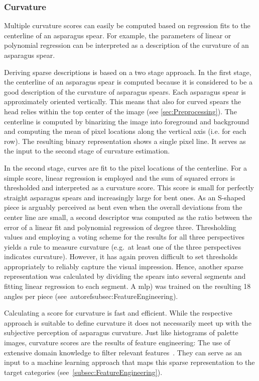 \subsubsection{Curvature}
\label{subsec:Curvature}

Multiple curvature scores can easily be computed based on regression fits to the centerline of an asparagus spear. For example, the parameters of linear or polynomial regression can be interpreted as a description of the curvature of an asparagus spear. 

Deriving sparse descriptions is based on a two stage approach. In the first stage, the centerline of an asparagus spear is computed because it is considered to be a good description of the curvature of asparagus spears. Each asparagus spear is approximately oriented vertically. This means that also for curved spears the head relies within the top center of the image (see \autoref{sec:Preprocessing}). The centerline is computed by binarizing the image into foreground and background and computing the mean of pixel locations along the vertical axis (i.e. for each row). The resulting binary representation shows a single pixel line. It serves as the input to the second stage of curvature estimation.

In the second stage, curves are fit to the pixel locations of the centerline. For a simple score, linear regression is employed and the sum of squared errors is thresholded and interpreted as a curvature score. This score is small for perfectly straight asparagus spears and increasingly large for bent ones. As an S-shaped piece is arguably perceived as bent even when the overall deviations from the center line are small, a second descriptor was computed as the ratio between the error of a linear fit and polynomial regression of degree three. Thresholding values and employing a voting scheme for the results for all three perspectives yields a rule to measure curvature (e.g.\ at least one of the three perspectives indicates curvature). However, it has again proven difficult to set thresholds appropriately to reliably capture the visual impression. Hence, another sparse representation was calculated by dividing the spears into several segments and fitting linear regression to each segment. A \acrfull{mlp}) was trained on the resulting 18 angles per piece (see~autoref{subsec:FeatureEngineering}).

\bigskip
Calculating a score for curvature is fast and efficient. While the respective approach is suitable to define curvature it does not necessarily meet up with the subjective perception of asparagus curvature. Just like histograms of palette images, curvature scores are the results of feature engineering: The use of extensive domain knowledge to filter relevant features~\citep{zheng2018feature}. They can serve as an input to a machine learning approach that maps this sparse representation to the target categories (see~\autoref{subsec:FeatureEngineering}).


